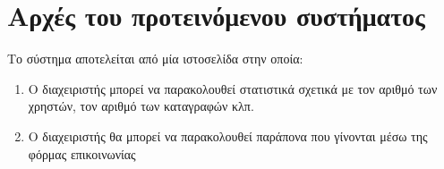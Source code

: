 \section{Αρχές του προτεινόμενου συστήματος}

Το σύστημα αποτελείται από μία ιστοσελίδα στην οποία:
\begin{enumerate}
	\item Ο διαχειριστής μπορεί να παρακολουθεί στατιστικά σχετικά με τον αριθμό των χρηστών, τον αριθμό των καταγραφών κλπ.
	\item Ο διαχειριστής θα μπορεί να παρακολουθεί παράπονα που γίνονται μέσω της φόρμας επικοινωνίας
\end{enumerate}

